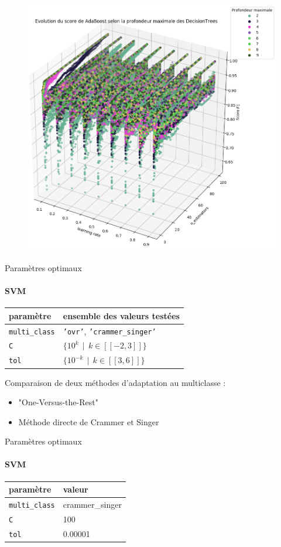 \documentclass[usenames,dvipsnames]{beamer}
\begin{document}
\begin{frame}
\begin{figure}
\centering
\includegraphics[width=.7\textwidth]{img/adaboost_depth.png}
\end{figure}
\end{frame}


\begin{frame}{Paramètres optimaux}
\framesubtitle{SVM}

\begin{table}
\centering
\begin{tabular}{ll}
paramètre & ensemble des valeurs testées \\
\hline
\texttt{multi\_class} & \texttt{'ovr'}, \texttt{'crammer\_singer'} \\
\texttt{C} & $\{10^k \>\> | \>\> k \in [\![-2, 3]\!] \}$ \\
\texttt{tol} & $\{10^{-k} \>\> | \>\> k \in [\![3, 6]\!] \}$ \\
\end{tabular}

\end{table}

\bigskip

Comparaison de deux méthodes d'adaptation au multiclasse :

\begin{itemize}
\item "One-Versus-the-Rest"
\item Méthode directe de Crammer et Singer
\end{itemize}


\end{frame}

\begin{frame}{Paramètres optimaux}
\framesubtitle{SVM}

\begin{table}[h]
\centering
\begin{tabular}{ll}
paramètre & valeur \\
\hline
\texttt{multi\_class} & crammer\_singer \\
\texttt{C} & 100 \\
\texttt{tol} & 0.00001\\
\end{tabular}
\end{table}
\end{frame}
\end{document}
